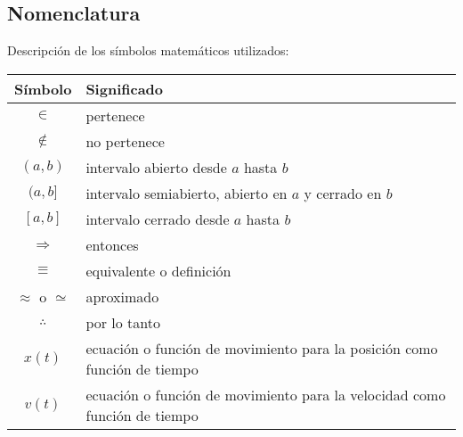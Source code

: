 \clearpage

\subsection{Nomenclatura}

Descripción de los símbolos matemáticos utilizados:

\begin{table}[!ht]
  \centering
  \begin{tabular}{cl}
    \hline\hline
    Símbolo & Significado \\
    \hline
    $\in$ & pertenece \\
    $\notin$ & no pertenece \\
    $(a,b)$ & intervalo abierto desde $a$ hasta $b$ \\
    $(a,b]$ &  intervalo semiabierto, abierto en $a$ y cerrado en $b$ \\
    $[a,b]$ & intervalo cerrado desde $a$ hasta $b$  \\
    $\Rightarrow$ & entonces \\
    \(\equiv \) & equivalente o definición \\
    \(\approx \) o \( \simeq \) & aproximado \\
    \(\therefore\) & por lo tanto \\
    \( x(t) \) & ecuación o función de movimiento para la posición como función
    de tiempo \\
    \( v(t) \) & ecuación o función de movimiento para la velocidad como
    función de tiempo \\
    \hline\hline
  \end{tabular}
\end{table}
